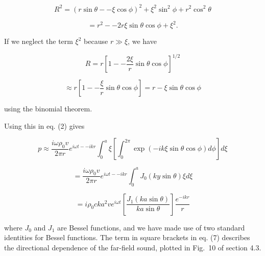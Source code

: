   \begin{equation*}R^2=(r \sin \theta -- \xi \cos \phi)^2 + \xi^2 \sin^2 \phi + 
  r^2 \cos^2 \theta \end{equation*} 

  \begin{equation*}= r^2 -- 2 r \xi \sin \theta \cos \phi +\xi^2 . 
  \tag{3}\end{equation*} 

  If we neglect the term $\xi^2$ because $r \gg \xi$, we have 

  \begin{equation*}R = r \left[ 1 -- \dfrac{2\xi}{r} \sin \theta \cos \phi 
  \right]^{1/2}\end{equation*} 

  \begin{equation*}\approx r \left[ 1 -- \dfrac{\xi}{r} \sin \theta \cos \phi 
  \right]=r-\xi \sin \theta \cos \phi \tag{4}\end{equation*} 

  \noindent{}using the binomial theorem. 

  Using this in eq. (2) gives 

  \begin{equation*}p\approx \dfrac{i \omega \rho_0 v}{2 \pi r} e^{i \omega t -- 
  ikr} \int_0^a{\xi \left[ \int_0^{2 \pi}{\exp(-ik\xi \sin \theta \cos \phi) d 
  \phi} \right] d\xi} \tag{5}\end{equation*} 

  \begin{equation*}=\dfrac{i \omega \rho_0 v}{2 \pi r} e^{i \omega t -- ikr} 
  \int_0^a{J_0(ky \sin \theta) \xi d\xi} \tag{6}\end{equation*} 

  \begin{equation*}= i \rho_0 c k a^2 v e^{i \omega t} \left[ \dfrac{J_1(ka 
  \sin \theta)}{ka \sin \theta} \right] \dfrac{e^{-ikr}}{r} 
  \tag{7}\end{equation*} 

  \noindent{}where $J_0$ and $J_1$ are Bessel functions, and we have made use 
  of two standard identities for Bessel functions. The term in square brackets 
  in eq. (7) describes the directional dependence of the far-field sound, 
  plotted in Fig.\ 10 of section 4.3. 